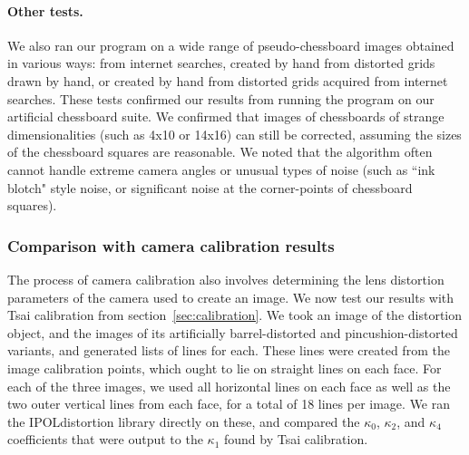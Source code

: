 \paragraph{Other tests.}
We also ran our program on a wide range of pseudo-chessboard images obtained in various ways: from internet searches, created by hand from distorted grids drawn by hand, or created by hand from distorted grids acquired from internet searches. These tests confirmed our results from running the program on our artificial chessboard suite. We confirmed that images of chessboards of strange dimensionalities (such as 4x10 or 14x16) can still be corrected, assuming the sizes of the chessboard squares are reasonable. We noted that the algorithm often cannot handle extreme camera angles or unusual types of noise (such as ``ink blotch" style noise, or significant noise at the corner-points of chessboard squares).

\subsubsection{Comparison with camera calibration results}

The process of camera calibration also involves determining the lens distortion parameters of the camera used to create an image. We now test our results with Tsai calibration from section~\ref{sec:calibration}. We took an image of the distortion object, and the images of its artificially barrel-distorted and pincushion-distorted variants, and generated lists of lines for each. These lines were created from the image calibration points, which ought to lie on straight lines on each face. For each of the three images, we used all horizontal lines on each face as well as the two outer vertical lines from each face, for a total of 18 lines per image. We ran the IPOLdistortion library directly on these, and compared the $\kappa_{0}$, $\kappa_{2}$, and $\kappa_{4}$ coefficients that were output to the $\kappa_{1}$ found by Tsai calibration.

